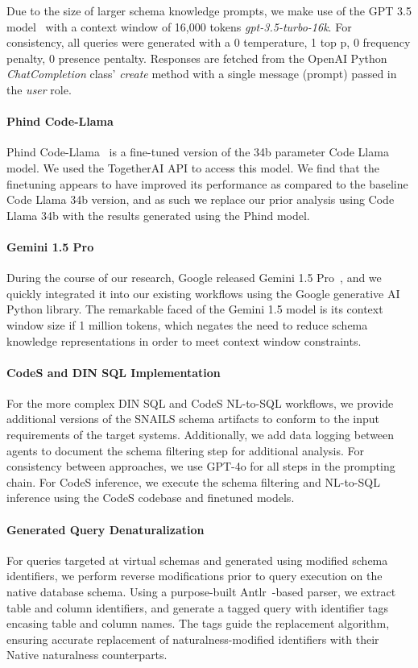 Due to the size of larger schema knowledge prompts, we make use of the GPT 3.5 model~\cite{openai-chatgpt-blog-post} with a context window of 16,000 tokens \emph{gpt-3.5-turbo-16k}.
For consistency, all queries were generated with a 0 temperature, 1 top p, 0 frequency penalty, 0 presence pentalty.
Responses are fetched from the OpenAI Python \emph{ChatCompletion} class' \emph{create} method with a single message (prompt) passed in the \emph{user} role. 

\paragraph{Phind Code-Llama}
Phind Code-Llama~\cite{phind2022phindcodellama} is a fine-tuned version of the 34b parameter Code Llama model.
We used the TogetherAI API to access this model.
We find that the finetuning appears to have improved its performance as compared to the baseline Code Llama 34b version, and as such we replace our prior analysis using Code Llama 34b with the results generated using the Phind model.

\paragraph{Gemini 1.5 Pro}
During the course of our research, Google released Gemini 1.5 Pro~\cite{geminiteam2024gemini15}, and we quickly integrated it into our existing workflows using the Google generative AI Python library.
The remarkable faced of the Gemini 1.5 model is its context window size if 1 million tokens, which negates the need to reduce schema knowledge representations in order to meet context window constraints.

\paragraph{\textbf{CodeS and DIN SQL Implementation}}
For the more complex DIN SQL and CodeS NL-to-SQL workflows, we provide additional versions of the SNAILS schema artifacts to conform to the input requirements of the target systems.
Additionally, we add data logging between agents to document the schema filtering step for additional analysis.
For consistency between approaches, we use GPT-4o for all steps in the prompting chain.
For CodeS inference, we execute the schema filtering and NL-to-SQL inference using the CodeS codebase and finetuned models.

\paragraph{\textbf{Generated Query Denaturalization}}
For queries targeted at virtual schemas and generated using modified schema identifiers, we perform reverse modifications prior to query execution on the native database schema.
Using a purpose-built Antlr~\cite{Parr2014}-based parser, we extract table and column identifiers, and generate a tagged query with identifier tags encasing table and column names.
The tags guide the replacement algorithm, ensuring accurate replacement of naturalness-modified identifiers with their Native naturalness counterparts.


